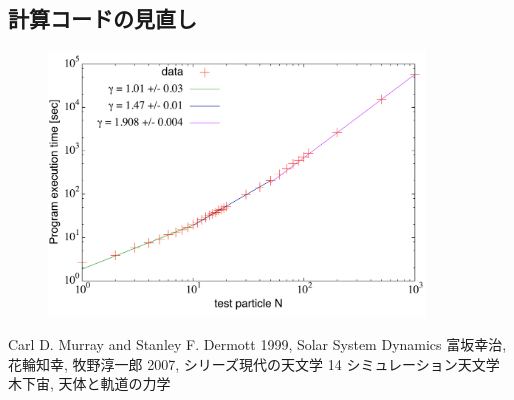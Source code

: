 \documentclass[11pt,a4paper,oneside,onecolumn]{jarticle}
\begin{document}
\subsection{計算コードの見直し}
\begin{figure}[H]
\centering
\includegraphics[width=10cm]{./image/Nbody_test.pdf}
\caption{\label{}}
\end{figure}

\begin{thebibliography}{9}
   Carl D. Murray and Stanley F. Dermott 1999, Solar System Dynamics
   富坂幸治, 花輪知幸, 牧野淳一郎 2007, シリーズ現代の天文学 14 シミュレーション天文学
   木下宙, 天体と軌道の力学
\end{thebibliography}
\end{document}
